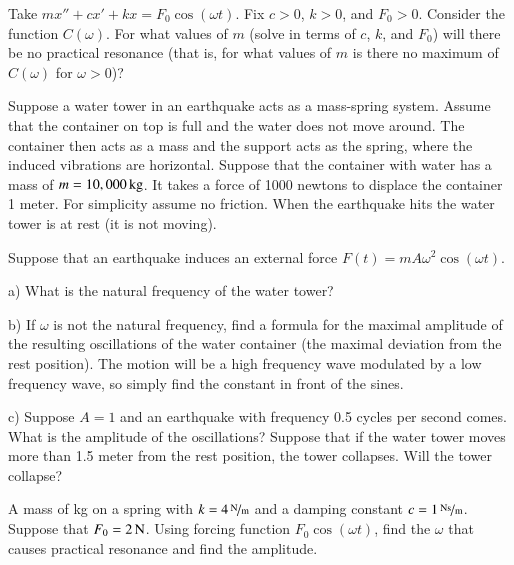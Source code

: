 \begin{exercise}
Take $m x'' + c x' + kx = F_0 \cos (\omega t)$.
Fix $c > 0$, $k > 0$, and $F_0 > 0$.  Consider the function $C(\omega)$.
For what values of $m$ (solve in terms of $c$, $k$, and $F_0$) will there be no
practical resonance (that is, for what values of $m$ is there no maximum of
$C(\omega)$ for $\omega > 0$)?
\end{exercise}

\begin{exercise}
Suppose a water tower in an earthquake acts as a mass-spring system.
Assume that the container on top is full and the water does not move around.
The container then acts as a mass and the support acts as the spring, where
the induced vibrations are horizontal.  Suppose that the container with water
has a mass of $m=\unit[10,000]{kg}$.  It takes a force of 1000 newtons to displace 
the container 1 meter.  For simplicity assume no friction.
When the earthquake hits the water tower is at rest (it is not moving).

Suppose that an earthquake induces an external force 
$F(t) = m A \omega^2 \cos (\omega t)$.

a) What is the natural frequency of the water tower?

b) If $\omega$ is not the natural frequency, find a formula for the maximal
amplitude of the resulting oscillations of the water container (the maximal
deviation from the rest position).  The motion will be a high frequency wave
modulated by a low frequency wave, so simply find the constant in front of the
sines.

c) Suppose $A = 1$ and an earthquake with frequency 0.5 cycles per second
comes.  What is the amplitude of the oscillations?  Suppose that if the water
tower moves more than 1.5 meter from the rest position, the tower collapses.  Will the tower collapse?
\end{exercise}

\setcounter{exercise}{100}

\begin{exercise}
A mass of \unit[4]{kg} on a spring with $k=\unitfrac[4]{N}{m}$ and a damping
constant $c=\unitfrac[1]{Ns}{m}$.
Suppose that $F_0 = \unit[2]{N}$.  Using forcing function $F_0 \cos (\omega t)$,
find the $\omega$ that causes practical resonance and find the amplitude.
\end{exercise}


